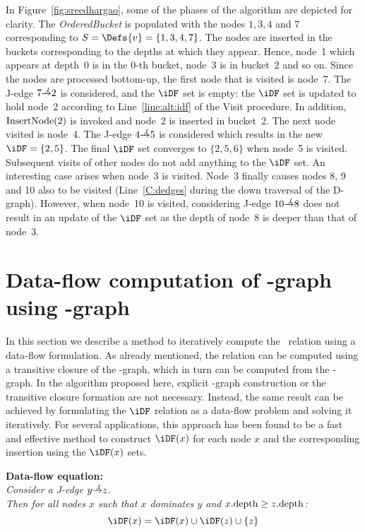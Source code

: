 {In Figure~\ref{fig:sreedhargao}, some of the phases of the algorithm are depicted for clarity. 
The \textit{OrderedBucket} is populated with the nodes $1,3,4$ and $7$ corresponding to $S=\Defs{v}=\{1,3,4,7\}$. 
The nodes are inserted in the buckets corresponding to the depths at which they appear. 
Hence, node~1 which appears at depth~0 is in the 0-th bucket, node~3 is in bucket~2 and so on. 
Since the nodes are processed bottom-up, the first node that is visited is node~7. 
The J-edge $7 \st{J} 2$ is considered, and the $\iDF$ set is empty: 
the $\iDF$ set is updated to hold node~2 according to Line~\ref{line:alt:idf} of the Visit procedure. 
In addition, $\textrm{InsertNode}(2)$ is invoked and node~2 is inserted in bucket~2. 
The next node visited is node~4. 
The J-edge $4 \st{J} 5$ is considered which results in the new $\iDF = \{2,5\}$. 
The final $\iDF$ set converges to $\{2,5,6\}$ when node~5 is visited. 
Subsequent visits of other nodes do not add anything to the $\iDF$ set. 
An interesting case arises when node~3 is visited. 
Node~3 finally causes nodes 8, 9 and 10 also to be visited (Line~\ref{C:dedges} during the down traversal of the D-graph). 
However, when node~10 is visited, considering J-edge $10 \st{J} 8$ does not result in an update of the $\iDF$ set as the depth of node~8 is deeper than that of node~3.


\section{Data-flow computation of \iDF-graph using \DJ-graph}
In this section we describe a method to iteratively compute the \iDF~relation using a data-flow formulation. 
As already mentioned, the \iDF relation can be computed using a transitive closure of the \DF-graph, which in turn can be computed from the \DJ-graph. 
In the algorithm proposed here, explicit \DF-graph construction or the transitive closure formation are not necessary. 
Instead, the same result can be achieved by formulating the $\iDF$ relation as a data-flow problem and solving it iteratively. 
For several applications, this approach has been found to be a fast and effective method to construct $\iDF(x)$ for each node $x$ and the corresponding \phifun insertion using the $\iDF(x)$ sets.

\begin{center}   \textbf{Data-flow equation:}\\   {\it 
Consider a J-edge $y \st{J} z$.\\
Then for all nodes $x$ such that $x$ dominates $y$ and $x.\textrm{depth} \geq z.\textrm{depth}$:   $$\iDF(x) = \iDF(x) \cup \iDF(z) \cup \{z\}$$} \end{center}

}
